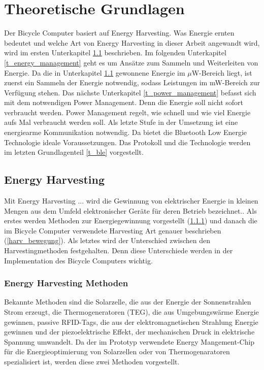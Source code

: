 \chapter{Theoretische Grundlagen}
Der Bicycle Computer basiert auf Energy Harvesting. Was Energie ernten bedeutet und welche Art von Energy Harvesting in dieser Arbeit angewandt wird, wird im ersten Unterkapitel \ref{t_harvesting} beschrieben. Im folgenden Unterkapitel \ref{t_energy_management} geht es um Ansätze zum Sammeln und Weiterleiten von Energie. Da die in Unterkapitel \ref{t_harvesting} gewonnene Energie im $\mu$W-Bereich liegt, ist zuerst ein Sammeln der Energie notwendig, sodass Leistungen im mW-Bereich zur Verfügung stehen. Das nächste Unterkapitel \ref{t_power_management} befasst sich mit dem notwendigen Power Management. Denn die
Energie soll nicht sofort verbraucht werden. Power Management regelt, wie schnell und wie viel Energie aufs Mal verbraucht werden soll. Als letzte Stufe in der Umsetzung ist eine energiearme Kommunikation notwendig. Da bietet die Bluetooth Low Energie Technologie ideale Voraussetzungen. Das Protokoll und die Technologie werden im letzten Grundlagenteil \ref{t_ble} vorgestellt.


\section{Energy Harvesting}\label{t_harvesting} 

\glqq Mit Energy Harvesting ... wird die Gewinnung von elektrischer Energie in kleinen Mengen aus dem Umfeld elektronischer Geräte für deren Betrieb bezeichnet.\grqq \cite{harvesting}. Als erstes werden Methoden zur Energiegewinnung vorgestellt (\ref{harv_arten}) und danach die im Bicycle Computer verwendete Harvesting Art genauer beschrieben (\ref{harv_bewegung}). Als letztes wird der Unterschied zwischen den Harvestingmethoden festgehalten. Denn diese Unterschiede werden in der Implementation des Bicycle Computers wichtig.


\subsection{Energy Harvesting Methoden}\label{harv_arten} 

Bekannte Methoden sind die Solarzelle, die aus der Energie der Sonnenstrahlen Strom erzeugt, die Thermogeneratoren (TEG), die aus Umgebungswärme Energie gewinnen,  passive RFID-Tags, die aus der elektromagnetischen Strahlung Energie gewinnen und der piezoelektrische Effekt, der mechanischen Druck in elektrische Spannung umwandelt. Da der im Prototyp verwendete Energy Mangement-Chip \cite{datasheet_EM85} für die Energieoptimierung von Solarzellen oder von Thermogenaratoren spezialisiert ist, werden diese zwei Methoden vorgestellt. 

